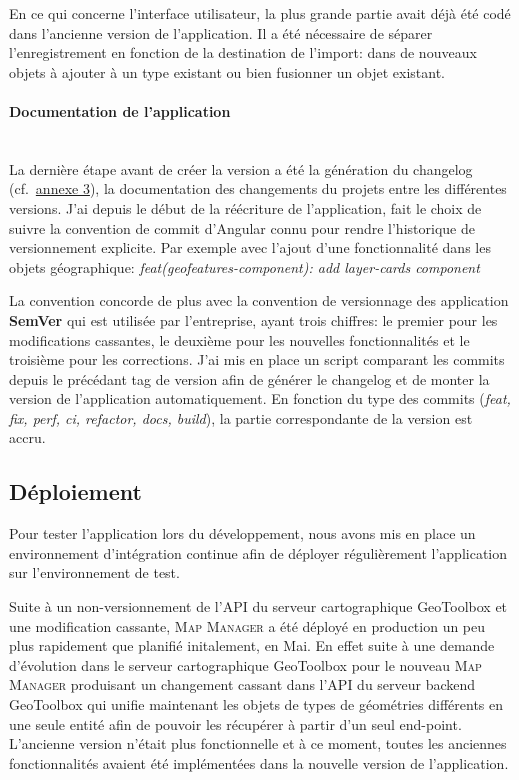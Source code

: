 \documentclass{rapportUHA40}
\begin{document}
En ce qui concerne l'interface utilisateur, la plus grande partie avait déjà
été codé dans l'ancienne version de l'application. Il a été nécessaire de
séparer l'enregistrement en fonction de la destination de l'import: dans de
nouveaux objets à ajouter à un type existant ou bien fusionner un objet
existant. \\

\paragraph{Documentation de l'application}\mbox{}\\
La dernière étape avant de créer la version a été la génération du changelog
(cf.\ \hyperlink{ANNEX3}{annexe 3}), la documentation des changements du projets
entre les différentes versions. J'ai depuis le début de la réécriture de
l'application, fait le choix de suivre la convention de commit d'Angular connu
pour rendre l'historique de versionnement explicite. Par exemple avec l'ajout d'une
fonctionnalité dans les objets géographique: \textit{feat(geofeatures-component): add layer-cards component}

La convention concorde de plus avec la convention de versionnage des
application \textbf{SemVer} qui est utilisée par l'entreprise, ayant trois
chiffres: le premier pour les modifications cassantes, le deuxième pour les
nouvelles fonctionnalités et le troisième pour les corrections. J'ai mis en
place un script comparant les commits depuis le précédant tag de version afin
de générer le changelog et de monter la version de l'application
automatiquement. En fonction du type des commits (\textit{feat, fix, perf, ci,
  refactor, docs, build}), la partie correspondante de la version est accru.

\subsection{Déploiement}
Pour tester l'application lors du développement, nous avons mis en place un
environnement d'intégration continue afin de déployer régulièrement
l'application sur l'environnement de test.

Suite à un non-versionnement de l'API du serveur cartographique GeoToolbox et
une modification cassante, \textsc{Map Manager} a été déployé en production un
peu plus rapidement que planifié initalement, en Mai. En effet suite à une
demande d'évolution dans le serveur cartographique GeoToolbox pour le nouveau
\textsc{Map Manager} produisant un changement cassant dans l'API du serveur
backend GeoToolbox qui unifie maintenant les objets de types de géométries
différents en une seule entité afin de pouvoir les récupérer à partir d'un seul
end-point. L'ancienne version n'était plus fonctionnelle et à ce moment, toutes
les anciennes fonctionnalités avaient été implémentées dans la nouvelle version
de l'application.
\end{document}
